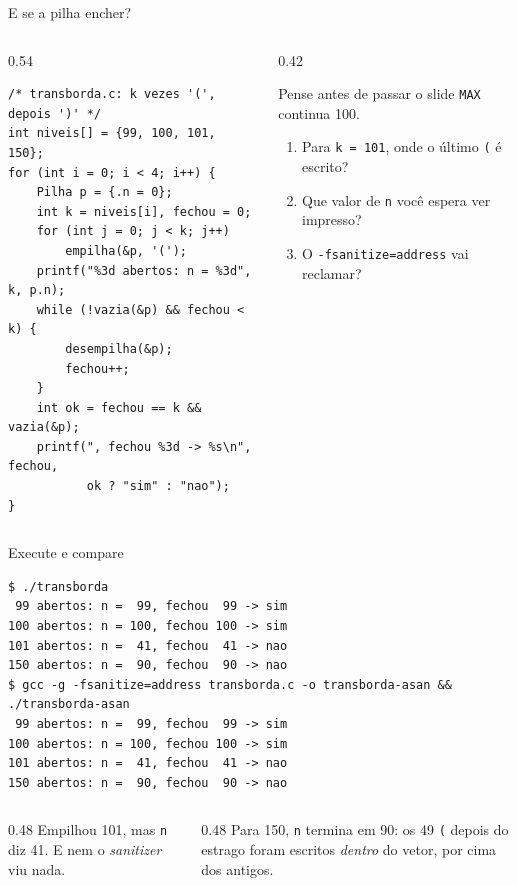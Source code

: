 \documentclass[aspectratio=169]{beamer}
\begin{document}
\begin{frame}[fragile]{E se a pilha encher?}
  \begin{columns}[c]
    \begin{column}{0.54\textwidth}
\begin{lstlisting}[style=tinyC]
/* transborda.c: k vezes '(', depois ')' */
int niveis[] = {99, 100, 101, 150};
for (int i = 0; i < 4; i++) {
    Pilha p = {.n = 0};
    int k = niveis[i], fechou = 0;
    for (int j = 0; j < k; j++)
        empilha(&p, '(');
    printf("%3d abertos: n = %3d", k, p.n);
    while (!vazia(&p) && fechou < k) {
        desempilha(&p);
        fechou++;
    }
    int ok = fechou == k && vazia(&p);
    printf(", fechou %3d -> %s\n", fechou,
           ok ? "sim" : "nao");
}
\end{lstlisting}
    \end{column}
    \begin{column}{0.42\textwidth}
      \begin{block}{Pense antes de passar o slide}
        \small \texttt{MAX} continua 100.
        \begin{enumerate}
          \item Para \texttt{k = 101}, onde o último \texttt{(} é escrito?
          \item Que valor de \texttt{n} você espera ver impresso?
          \item O \texttt{-fsanitize=address} vai reclamar?
        \end{enumerate}
      \end{block}
    \end{column}
  \end{columns}
\end{frame}

\begin{frame}[fragile]{Execute e compare}
\begin{lstlisting}[style=shellStyle]
$ ./transborda
 99 abertos: n =  99, fechou  99 -> sim
100 abertos: n = 100, fechou 100 -> sim
101 abertos: n =  41, fechou  41 -> nao
150 abertos: n =  90, fechou  90 -> nao
$ gcc -g -fsanitize=address transborda.c -o transborda-asan && ./transborda-asan
 99 abertos: n =  99, fechou  99 -> sim
100 abertos: n = 100, fechou 100 -> sim
101 abertos: n =  41, fechou  41 -> nao
150 abertos: n =  90, fechou  90 -> nao
\end{lstlisting}
  \begin{columns}[T]
    \begin{column}{0.48\textwidth}
      \small Empilhou 101, mas \texttt{n} diz 41. E nem o
      \emph{sanitizer} viu nada.
    \end{column}
    \begin{column}{0.48\textwidth}
      \small Para 150, \texttt{n} termina em 90: os 49 \texttt{(} depois do
      estrago foram escritos \emph{dentro} do vetor, por cima dos antigos.
    \end{column}
  \end{columns}
\end{frame}
\end{document}

